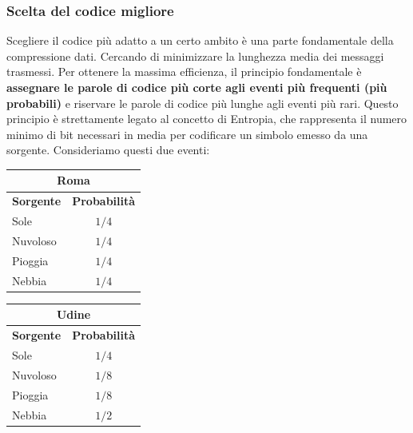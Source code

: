 \documentclass{article}
\theoremstyle{definition}
\numberwithin{equation}{section}
\begin{document}
\subsubsection{Scelta del codice migliore}
Scegliere il codice più adatto a un certo ambito è una parte fondamentale della compressione dati. Cercando di minimizzare la lunghezza media dei messaggi trasmessi. Per ottenere la massima efficienza, il principio fondamentale è \textbf{assegnare le parole di codice più corte agli eventi più frequenti (più probabili)} e riservare le parole di codice più lunghe agli eventi più rari. Questo principio è strettamente legato al concetto di Entropia, che rappresenta il numero minimo di bit necessari in media per codificare un simbolo emesso da una sorgente. Consideriamo questi due eventi:
\begin{table}[htpb]
    \centering
    \begin{minipage}[t]{0.45\textwidth}
        \centering
        \begin{tabular}{|l|c|}
            \hline
            \multicolumn{2}{|c|}{\textbf{Roma}}      \\ \hline
            \textbf{Sorgente} & \textbf{Probabilità} \\ \hline
            Sole              & $1/4$                \\ \hline
            Nuvoloso          & $1/4$                \\ \hline
            Pioggia           & $1/4$                \\ \hline
            Nebbia            & $1/4$                \\ \hline
        \end{tabular}
    \end{minipage}
    \hfill
    \begin{minipage}[t]{0.45\textwidth}
        \centering
        \begin{tabular}{|l|c|}
            \hline
            \multicolumn{2}{|c|}{\textbf{Udine}}     \\ \hline
            \textbf{Sorgente} & \textbf{Probabilità} \\ \hline
            Sole              & $1/4$                \\ \hline
            Nuvoloso          & $1/8$                \\ \hline
            Pioggia           & $1/8$                \\ \hline
            Nebbia            & $1/2$                \\ \hline
        \end{tabular}
    \end{minipage}
\end{table}
\end{document}
